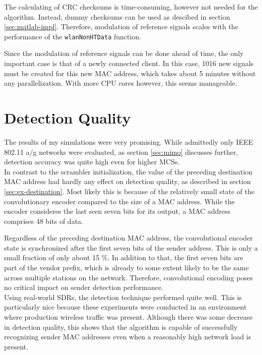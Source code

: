 The calculating of CRC checksums is time-consuming, however not needed for the algorithm. Instead, dummy checksums can be used as descibed in section \ref{sec:matlab-impl}. Therefore, modulation of reference signals scales with the performance of the \texttt{wlanNonHTData} function.

Since the modulation of reference signals can be done ahead of time, the only important case is that of a newly connected client. In this case, 1016 new signals must be created for this new MAC address, which takes about 5 minutes without any parallelization. With more CPU cores however, this seems manageable.



\section{Detection Quality}\label{sec:detection-quality}

The results of my simulations were very promising. While admittedly only IEEE 802.11 a/g networks were evaluated, as section \ref{sec:mimo} discusses further, detection accuracy was quite high even for higher \glspl{MCS}.\\

In contrast to the scrambler initialization, the value of the preceding destination MAC address had hardly any effect on detection quality, as described in section \ref{sec:ex-destination}. Most likely this is because of the relatively small state of the convolutionary encoder compared to the size of a MAC address. While the encoder consideres the last seen seven bits for its output, a MAC address comprises 48 bits of data.

Regardless of the preceding destination MAC address, the convolutional encoder state is synchronized after the first seven bits of the sender address. This is only a small fraction of only about 15 \%. In addition to that, the first seven bits are part of the vendor prefix, which is already to some extent likely to be the same across multiple stations on the network. Therefore, convolutional encoding poses no critical impact on sender detection performance.\\

Using real-world \glspl{SDR}, the detection technique performed quite well. This is particularly nice because these experiments were conducted in an environment where production wireless traffic was present. Although there was some decrease in detection quality, this shows that the algorithm is capable of successfully recognizing sender MAC addresses even when a reasonably high network load is present.


